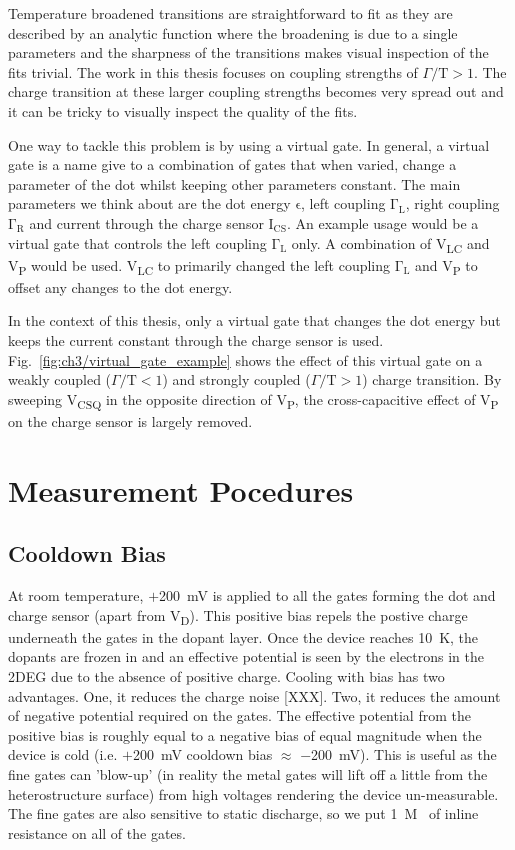 Temperature broadened transitions are straightforward to fit as they are described by an analytic function where the broadening is due to a single parameters and the sharpness of the transitions makes visual inspection of the fits trivial. The work in this thesis focuses on coupling strengths of $\Gamma/\mathrm{T}>1$. The charge transition at these larger coupling strengths becomes very spread out and it can be tricky to visually inspect the quality of the fits. 

One way to tackle this problem is by using a virtual gate. In general, a virtual gate is a name give to a combination of gates that when varied, change a parameter of the dot whilst keeping other parameters constant. The main parameters we think about are the dot energy $\mathrm{\epsilon}$, left coupling $\mathrm{\Gamma_L}$, right coupling $\mathrm{\Gamma_R}$ and current through the charge sensor $\mathrm{I_{CS}}$. An example usage would be a virtual gate that controls the left coupling $\mathrm{\Gamma_L}$ only. A combination of V\textsubscript{LC} and V\textsubscript{P} would be used. V\textsubscript{LC} to primarily changed the left coupling $\mathrm{\Gamma_L}$ and V\textsubscript{P} to offset any changes to the dot energy. 

In the context of this thesis, only a virtual gate that changes the dot energy but keeps the current constant through the charge sensor is used. Fig.~\ref{fig:ch3/virtual_gate_example} shows the effect of this virtual gate on a weakly coupled ($\Gamma/\mathrm{T}<1$) and strongly coupled ($\Gamma/\mathrm{T}>1$) charge transition. By sweeping V\textsubscript{CSQ} in the opposite direction of V\textsubscript{P}, the cross-capacitive effect of V\textsubscript{P} on the charge sensor is largely removed. 


\afterpage{\clearpage}
\section{Measurement Pocedures}

\subsection{Cooldown Bias}
At room temperature, $+$\qty{200}{mV} is applied to all the gates forming the dot and charge sensor (apart from V\textsubscript{D}). This positive bias repels the postive charge underneath the gates in the dopant layer. Once the device reaches \qty{10}{K}, the dopants are frozen in and an effective potential is seen by the electrons in the 2DEG due to the absence of positive charge. Cooling with bias has two advantages. One, it reduces the charge noise [XXX]. Two, it reduces the amount of negative potential required on the gates. The effective potential from the positive bias is roughly equal to a negative bias of equal magnitude when the device is cold (i.e. $+$\qty{200}{mV} cooldown bias $\approx$ $-$\qty{200}{mV}). This is useful as the fine gates can 'blow-up' (in reality the metal gates will lift off a little from the heterostructure surface) from high voltages rendering the device un-measurable. The fine gates are also sensitive to static discharge, so we put \qty{1}{M\Omega} of inline resistance on all of the gates.   


